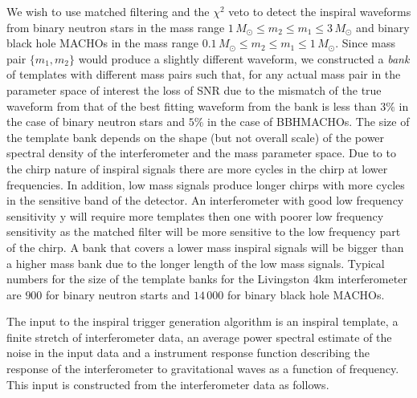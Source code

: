 We wish to use matched filtering and the $\chi^2$ veto to detect the inspiral
waveforms from binary neutron stars in the mass range $1\,M_\odot\le m_2\le
m_1\le 3\,M_\odot$ and binary black hole MACHOs in the mass range
$0.1\,M_\odot\le m_2\le m_1\le 1\,M_\odot$. Since mass pair $\{m_1,m_2\}$
would produce a slightly different waveform, we constructed a {\em bank} of
templates with different mass pairs such that, for any actual mass pair in the
parameter space of interest the loss of SNR due to the mismatch of the true
waveform from that of the best fitting waveform from the bank is less than
$3\%$ in the case of binary neutron stars and $5\%$ in the case of
BBHMACHOs\cite{owensatyha}.  The size of the template bank depends on the 
shape (but not overall scale) of the power spectral density of the
interferometer and the mass parameter space. Due to to the chirp nature of
inspiral signals there are more cycles in the chirp at lower frequencies. In
addition, low mass signals produce longer chirps with more cycles in the
sensitive band of the detector. An interferometer with good low frequency
sensitivity y will require more templates then one with poorer low frequency
sensitivity as the matched filter will be more sensitive to the low frequency
part of the chirp. A bank that covers a lower mass inspiral signals will be
bigger than a higher mass bank due to the longer length of the low mass signals. 
Typical numbers for the size of the template banks for the Livingston 4km
interferometer are $900$ for binary neutron starts and $14\,000$ for binary
black hole MACHOs.

The input to the inspiral trigger generation algorithm is an inspiral
template, a finite stretch of interferometer data, an average power spectral
estimate of the noise in the input data and a instrument response function
describing the response of the interferometer to gravitational waves as a
function of frequency. This input is constructed from the interferometer data
as follows.  

